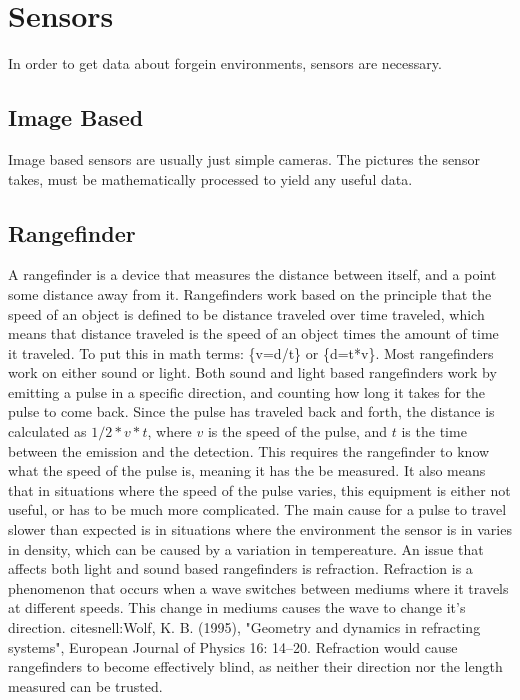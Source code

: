 \clearpage
\section{Sensors}
In order to get data about forgein environments, sensors are necessary.

\subsection{Image Based}
Image based sensors are usually just simple cameras. The pictures the sensor takes, must be mathematically processed to yield any useful data.
\subsection{Rangefinder}
A rangefinder is a device that measures the distance between itself, and a point some distance away from it. Rangefinders work based on the principle that the speed of an object is defined to be distance traveled over time traveled, which means that distance traveled is the speed of an object times the amount of time it traveled. To put this in math terms: \{v=d/t\} or \{d=t*v\}. Most rangefinders work on either sound or light. Both sound and light based rangefinders work by emitting a pulse in a specific direction, and counting how long it takes for the pulse to come back. Since the pulse has traveled back and forth, the distance is calculated as \(1/2*v*t\), where \(v\) is the speed of the pulse, and \(t\) is the time between the emission and the detection. This requires the rangefinder to know what the speed of the pulse is, meaning it has the be measured. It also means that in situations where the speed of the pulse varies, this equipment is either not useful, or has to be much more complicated. The main cause for a pulse to travel slower than expected is in situations where the environment the sensor is in varies in density, which can be caused by a variation in tempereature\cite{refraction}.
An issue that affects both light and sound based rangefinders is refraction. Refraction is a phenomenon that occurs when a wave switches between mediums where it travels at different speeds. This change in mediums causes the wave to change it's direction. cite{snell:Wolf, K. B. (1995), "Geometry and dynamics in refracting systems", European Journal of Physics 16: 14–20.} Refraction would cause rangefinders to become effectively blind, as neither their direction nor the length measured can be trusted.

